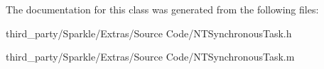 The documentation for this class was generated from the following files\+:\begin{DoxyCompactItemize}
\item 
third\+\_\+party/\+Sparkle/\+Extras/\+Source Code/N\+T\+Synchronous\+Task.\+h\item 
third\+\_\+party/\+Sparkle/\+Extras/\+Source Code/N\+T\+Synchronous\+Task.\+m\end{DoxyCompactItemize}
